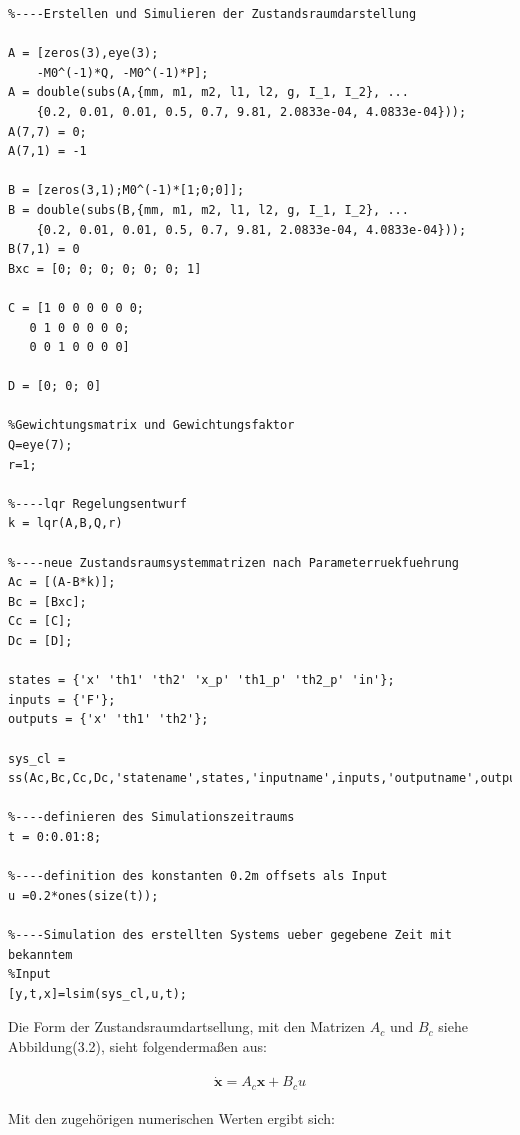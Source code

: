 \documentclass[a4paper, 10pt]{report}
\begin{document}
\begin{lstlisting}
%----Erstellen und Simulieren der Zustandsraumdarstellung

A = [zeros(3),eye(3);
    -M0^(-1)*Q, -M0^(-1)*P];
A = double(subs(A,{mm, m1, m2, l1, l2, g, I_1, I_2}, ...
    {0.2, 0.01, 0.01, 0.5, 0.7, 9.81, 2.0833e-04, 4.0833e-04}));
A(7,7) = 0;
A(7,1) = -1

B = [zeros(3,1);M0^(-1)*[1;0;0]];
B = double(subs(B,{mm, m1, m2, l1, l2, g, I_1, I_2}, ...
    {0.2, 0.01, 0.01, 0.5, 0.7, 9.81, 2.0833e-04, 4.0833e-04}));
B(7,1) = 0
Bxc = [0; 0; 0; 0; 0; 0; 1]

C = [1 0 0 0 0 0 0;
   0 1 0 0 0 0 0;
   0 0 1 0 0 0 0]

D = [0; 0; 0]

%Gewichtungsmatrix und Gewichtungsfaktor
Q=eye(7);
r=1;

%----lqr Regelungsentwurf
k = lqr(A,B,Q,r)

%----neue Zustandsraumsystemmatrizen nach Parameterruekfuehrung
Ac = [(A-B*k)];
Bc = [Bxc];
Cc = [C];
Dc = [D];

states = {'x' 'th1' 'th2' 'x_p' 'th1_p' 'th2_p' 'in'};
inputs = {'F'};
outputs = {'x' 'th1' 'th2'};

sys_cl = ss(Ac,Bc,Cc,Dc,'statename',states,'inputname',inputs,'outputname',outputs);

%----definieren des Simulationszeitraums
t = 0:0.01:8;

%----definition des konstanten 0.2m offsets als Input
u =0.2*ones(size(t));

%----Simulation des erstellten Systems ueber gegebene Zeit mit bekanntem
%Input
[y,t,x]=lsim(sys_cl,u,t);
\end{lstlisting}
Die Form der Zustandsraumdartsellung, mit den Matrizen $A_{c}$ und $B_{c}$ siehe Abbildung(3.2), sieht folgendermaßen aus:\\\\
\begin{equation}
\label{eqn:Zustandraumdarstellung}
\mathbf{\dot{x}}=A_{c} \mathbf{x}+B_{c} u
\end{equation}
\\
Mit den zugehörigen numerischen Werten ergibt sich:
\\ \\
\end{document}
